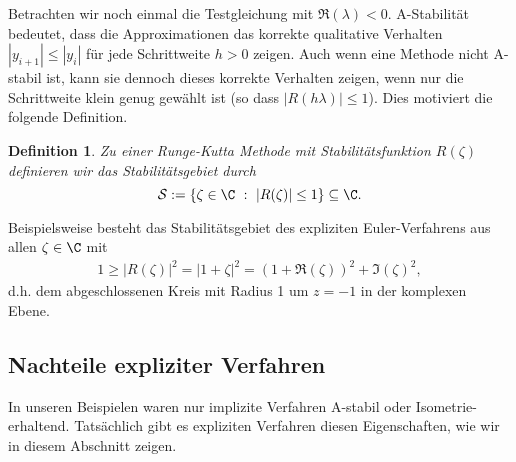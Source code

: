 \documentclass[
]{mycourse}
\theoremstyle{mythm}
\newtheorem{definition}[theorem]{Definition}
\theoremstyle{break}
\begin{document}
Betrachten wir noch einmal die Testgleichung mit $\Re(\lambda)<0$. A-Stabilität bedeutet, dass die Approximationen das 
korrekte qualitative Verhalten 
$|y_{i+1}|\leq |y_i|$ für jede Schrittweite $h>0$ zeigen. Auch wenn eine Methode nicht A-stabil ist, kann sie dennoch dieses
korrekte Verhalten zeigen, wenn nur die Schrittweite klein genug gewählt ist (so dass $|R(h\lambda)|\leq 1$).
Dies motiviert die folgende Definition.

\begin{definition}
Zu einer Runge-Kutta Methode mit Stabilitätsfunktion $R(\zeta)$ definieren wir 
das \emph{Stabilitätsgebiet} durch 
\[
\mathcal S:=\left\{ \zeta\in \C\ : \ |R(\zeta)|\leq 1\right\}\subseteq \C.
\]
\end{definition}

Beispielsweise besteht das Stabilitätsgebiet des expliziten Euler-Verfahrens 
aus allen $\zeta\in \C$ mit
\begin{align*}
1\geq |R(\zeta)|^2=|1+\zeta|^2=(1+\Re(\zeta))^2+\Im(\zeta)^2,
\end{align*}
d.h. dem abgeschlossenen Kreis mit Radius 1 um $z=-1$ in der komplexen Ebene. 





\subsection{Nachteile expliziter Verfahren}\label{subsect:limit_expl}

In unseren Beispielen waren nur implizite Verfahren A-stabil oder Isometrie-erhaltend. Tatsächlich
gibt es expliziten Verfahren diesen Eigenschaften, wie wir in diesem Abschnitt zeigen.
\end{document}
